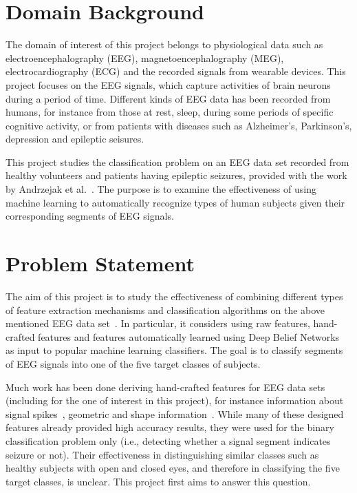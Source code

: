 \documentclass[12pt]{article}
\begin{document}
\maketitle

\section{Domain Background}

\noindent
The domain of interest of this project belongs to physiological data such as electroencephalography (EEG), magnetoencephalography (MEG), electrocardiography (ECG) and the recorded signals from wearable devices. This project focuses on the EEG signals, which capture activities of brain neurons during a period of time. Different kinds of EEG data has been recorded from humans, for instance from those at rest, sleep, during some periods of specific cognitive activity, or from patients with diseases such as Alzheimer's, Parkinson's, depression and epileptic seisures. 

This project studies the classification problem on an EEG data set recorded from healthy volunteers and patients having epileptic seizures, provided with the work by Andrzejak et al.~\cite{andrzejak2001indications}. The purpose is to examine the effectiveness of using machine learning to automatically recognize types of human subjects given their corresponding segments of EEG signals. 

\section{Problem Statement}

The aim of this project is to study the effectiveness of combining different types of feature extraction mechanisms and classification algorithms on the above mentioned EEG data set~\cite{andrzejak2001indications}. In particular, it considers using raw features, hand-crafted features and features automatically learned using Deep Belief Networks~\cite{hinton2006reducing} as input to popular machine learning classifiers. The goal is to classify segments of EEG signals into one of the five target classes of subjects.

Much work has been done deriving hand-crafted features for EEG data sets (including for the one of interest in this project), for instance information about signal spikes~\cite{nigam2004neural}, geometric and shape information~\cite{wulsin2011modeling}. While many of these designed features already provided high accuracy results, they were used for the binary classification problem only (i.e., detecting whether a signal segment indicates seizure or not). Their effectiveness in distinguishing similar classes such as healthy subjects with open and closed eyes, and therefore in classifying the five target classes, is unclear. This project first aims to answer this question.
\end{document}
